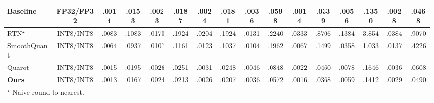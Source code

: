 \begin{table}[t]
{\begin{tabular}{lccccccccccccccc}
\textbf{Baseline} &FP32/FP32        & .0014 & .0153 %
& .0023 & .0187 %
& .0024 & .0181 %
& .0036 & .0598 %
& .0014 & .0339  %
& .0056  &.1350 %
& .0028 & .0468 \\%
\midrule
RTN$^\star$    &INT8/INT8              
& .0083 & .1083 %
& .0170 & .1924 %
& .0204 & .1924 %
& .0131 & .2240 %
& .0333 & .8706  %
& .1384  & 3.854 %
& .0384 & .9070 \\%
SmoothQuant~\cite{xiao2022smoothquant}     &INT8/INT8             
& .0064 & .0937 %
& .0107 & .1161 %
& .0123 & .1037 %
& .0104 & .1962 %
& .0067 & .1499  %
& .0358  & 1.033 %
& .0137 & .4226 \\%
Quarot~\cite{ashkboos2024quarot}      &INT8/INT8            
& .0015 & .0195 %
& .0026 & .0251 %
& .0031 & .0248 %
& .0046 & .0848 %
& .0022 & .0460  %
& .0078  & .1646 %
& .0036 & .0608 \\%
\midrule
\rowcolor{ourgray} \textbf{Ours}  &INT8/INT8                
& .0013 & .0167 %
& .0024 & .0213 %
& .0026 & .0207 %
& .0036 & .0572 %
& .0016 & .0368  %
& .0059  & .1412 %
& .0029 & .0490 \\%

\bottomrule
\multicolumn{12}{l}{
\quad
$^\star$ Naive round to nearest.} \\
\end{tabular}
}
\label{tab:quantmacvo:EuRoC}
\end{table}